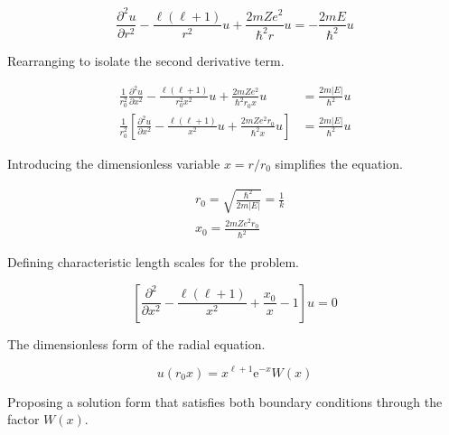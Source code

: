 \begin{equation}
\frac{\partial^{2} u}{\partial r^{2}}-\frac{\ell(\ell+1)}{r^{2}} u+\frac{2 m Z e^{2}}{\hbar^{2} r} u=-\frac{2 m E}{\hbar^{2}} u
\end{equation}

Rearranging to isolate the second derivative term.

\begin{align}
\frac{1}{r_{0}^{2}} \frac{\partial^{2} u}{\partial x^{2}}-\frac{\ell(\ell+1)}{r_{0}^{2} x^{2}} u+\frac{2 m Z e^{2}}{\hbar^{2} r_{0} x} u & =\frac{2 m|E|}{\hbar^{2}} u \\
\frac{1}{r_{0}^{2}}\left[\frac{\partial^{2} u}{\partial x^{2}}-\frac{\ell(\ell+1)}{x^{2}} u+\frac{2 m Z e^{2} r_{0}}{\hbar^{2} x} u\right] & =\frac{2 m|E|}{\hbar^{2}} u
\end{align}

Introducing the dimensionless variable $x = r/r_0$ simplifies the equation.

\begin{align}
& r_{0}=\sqrt{\frac{\hbar^{2}}{2 m|E|}}=\frac{1}{k}  \\
& x_{0}=\frac{2 m Z e^{2} r_{0}}{\hbar^{2}}
\end{align}

Defining characteristic length scales for the problem.

\begin{equation}
\left[\frac{\partial^{2}}{\partial x^{2}}-\frac{\ell(\ell+1)}{x^{2}}+\frac{x_{0}}{x}-1\right] u=0 \label{eq:9.52}
\end{equation}

The dimensionless form of the radial equation.

\begin{equation}
u\left(r_{0} x\right)=x^{\ell+1} \mathrm{e}^{-x} W(x)
\end{equation}

Proposing a solution form that satisfies both boundary conditions through the factor $W(x)$.

